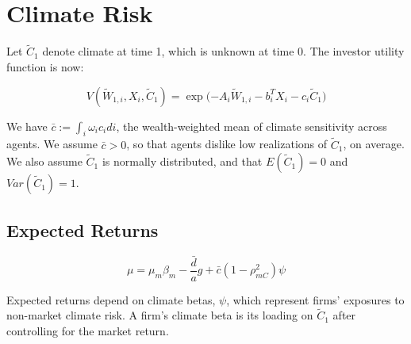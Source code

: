 \chapter{Climate Risk}


Let $\tilde{C}_1$ denote climate at time 1, which is unknown at
time 0. The investor utility function is now:

\begin{equation}
    V(\tilde{W}_{1,i}, X_i, \tilde{C}_1) = \exp{(-A_i \tilde{W}_{1,i} - b_i^T X_i - c_i \tilde{C}_1})
\end{equation}

We have $\bar{c} := \int_i \omega_i c_i di$, 
the wealth-weighted mean of climate sensitivity across agents. 
We assume $\bar{c} > 0$, so that agents dislike low realizations of 
$\tilde{C}_1$, on average. We also assume $\tilde{C}_1$ is normally
distributed, and that $E(\tilde{C}_1) = 0$ and $Var(\tilde{C}_1) = 1$.

\section{Expected Returns}

\begin{equation}
    \mu = \mu_m \beta_m - \frac{\bar{d}}{a}g + \bar{c}(1 - \rho^2_{mC}) \psi 
\end{equation}

Expected returns depend on climate betas, $\psi$, which represent 
firms' exposures to non-market climate risk. A firm's climate 
beta is its loading on $\tilde{C}_1$ after controlling for the market return. 